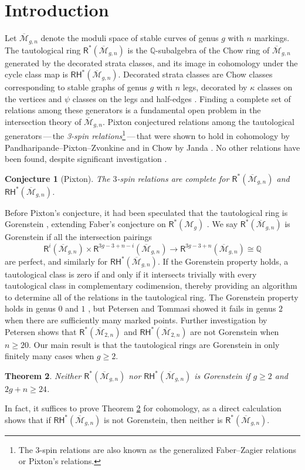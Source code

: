 \documentclass[12pt]{amsart}
\newtheorem{thm}{Theorem}
\newtheorem{conj}[thm]{Conjecture}
\theoremstyle{definition}
\newcommand{\qq}{\mathbb{Q}}
\newcommand{\R}{\mathsf{R}}
\newcommand{\RH}{\mathsf{RH}}
\newcommand{\M}{\mathcal{M}}
\newcommand{\Mb}{\overline{\M}}
\begin{document}
\section{Introduction}
Let $\Mb_{g,n}$ denote the moduli space of stable curves of genus $g$ with $n$ markings. The tautological ring $\R^*(\Mb_{g,n})$ is the $\qq$-subalgebra of the Chow ring of $\Mb_{g,n}$ generated by the decorated strata classes, and its image in cohomology under the cycle class map is $\RH^*(\Mb_{g,n})$. Decorated strata classes are Chow classes corresponding to stable graphs of genus $g$ with $n$ legs, decorated by $\kappa$ classes on the vertices and $\psi$ classes on the legs and half-edges \cite{GraberPandharipande,Pandharipandecalculus}. Finding a complete set of relations among these generators is a fundamental open problem in the intersection theory of $\Mb_{g,n}$. Pixton \cite{Pixton} conjectured relations among the tautological generators\,---\,the \emph{3-spin relations}\footnote{The $3$-spin relations are also known as the generalized Faber--Zagier relations or Pixton's relations.}\,---\,that were shown to hold in cohomology by Pandharipande--Pixton--Zvonkine \cite{PandharipandePixtonZvonkine} and in Chow by Janda \cite{Janda}. No other relations have been found, despite significant investigation \cite{CladerJanda,Jandarelations}.
\begin{conj}[Pixton]\label{Pixton}
The $3$-spin relations are complete for $\R^*(\Mb_{g,n})$ and $\RH^*(\Mb_{g,n})$.
\end{conj}
 Before Pixton's conjecture, it had been speculated that the tautological ring is Gorenstein \cite{FPspeculation,HainLooijenga,Pan3questions}, extending Faber's conjecture on $\R^*(\M_g)$ \cite{Faber}. We say $\R^*(\Mb_{g,n})$ is Gorenstein if all the intersection pairings
\[
\R^i(\Mb_{g,n})\times \R^{3g-3+n-i}(\Mb_{g,n})\rightarrow \R^{3g-3+n}(\Mb_{g,n})\cong\qq
\]
are perfect, and similarly for $\RH^*(\Mb_{g,n})$. If the Gorenstein property holds, a tautological class is zero if and only if it intersects trivially with every tautological class in complementary codimension, thereby providing an algorithm to determine all of the relations in the tautological ring. The Gorenstein property holds in genus $0$ and $1$ \cite{Keel,Petersengenusone}, but Petersen and Tommasi \cite{PetersenTommasi} showed it fails in genus $2$ when there are sufficiently many marked points. Further investigation by Petersen \cite{Petersen} shows that $\R^*(\Mb_{2,n})$ and $\RH^*(\Mb_{2,n})$ are not Gorenstein when $n\geq 20$. Our main result is that the tautological rings are Gorenstein in only finitely many cases when $g\geq 2$. 
\begin{thm}\label{thm:main}
    Neither $\R^*(\Mb_{g,n})$ nor $\RH^*(\Mb_{g,n})$ is Gorenstein if $g\geq 2$ and $2g+n \geq 24$.
\end{thm}
\noindent In fact, it suffices to prove Theorem \ref{thm:main} for cohomology, as a direct calculation \cite[Corollary 2.5]{PetersenTommasi} shows that if $\RH^*(\Mb_{g,n})$ is not Gorenstein, then neither is $\R^*(\Mb_{g,n})$.
\end{document}
